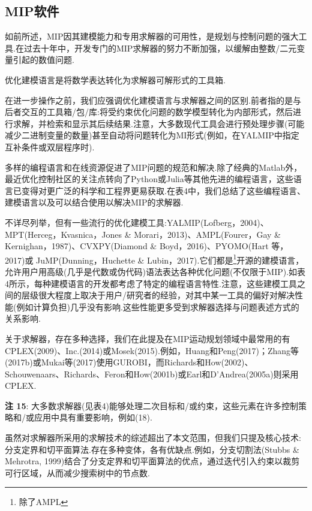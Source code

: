 \documentclass[10pt]{article}
\begin{document}
\subsection{MIP软件}

如前所述，MIP因其建模能力和专用求解器的可用性，是规划与控制问题的强大工具.在过去十年中，开发专门的MIP求解器的努力不断加强，以缓解由整数/二元变量引起的数值问题.

优化建模语言是将数学表达转化为求解器可解形式的工具箱.

在进一步操作之前，我们应强调优化建模语言与求解器之间的区别.前者指的是与后者交互的工具箱/包/库:将受约束优化问题的数学模型转化为内部形式，然后进行求解，并检索和显示其后续结果.注意，大多数现代工具会进行预处理步骤(可能减少二进制变量的数量)甚至自动将问题转化为MI形式(例如，在YALMIP中指定互补条件或双层程序时).



多样的编程语言和在线资源促进了MIP问题的规范和解决.除了经典的Matlab外，最近优化控制社区的关注点转向了Python或Julia等其他先进的编程语言，这些语言已变得对更广泛的科学和工程界更易获取.在表4中，我们总结了这些编程语言、建模语言以及可以结合使用以解决MIP的求解器.

不详尽列举，但有一些流行的优化建模工具:YALMIP(Lofberg，2004)、MPT(Herceg，Kvasnica，Jones \& Morari，2013)、AMPL(Fourer，Gay \& Kernighan，1987)、CVXPY(Diamond \& Boyd，2016)、PYOMO(Hart 等，2017)或 JuMP(Dunning，Huchette \& Lubin，2017).它们都是\footnote{除了AMPL}开源的建模语言，允许用户用高级(几乎是代数或伪代码)语法表达各种优化问题(不仅限于MIP).如表4所示，每种建模语言的开发都考虑了特定的编程语言特性.注意，这些建模工具之间的层级很大程度上取决于用户/研究者的经验，对其中某一工具的偏好对解决性能(例如计算负担)几乎没有影响.这些性能更多受到求解器选择与问题表述方式的关系影响.

关于求解器，存在多种选择，我们在此提及在MIP运动规划领域中最常用的有CPLEX(2009)、Inc.(2014)或Mosek(2015).例如，Huang和Peng(2017)；Zhang等(2017b)或Mukai等(2017)使用GUROBI，而Richards和How(2002)、Schouwenaars、Richards、Feron和How(2001b)或Earl和D'Andrea(2005a)则采用CPLEX.

\vspace{1 em}
\noindent\textbf{注 15}: 大多数求解器(见表4)能够处理二次目标和/或约束，这些元素在许多控制策略和/或应用中具有重要影响，例如(18).
\vspace{1 em}

虽然对求解器所采用的求解技术的综述超出了本文范围，但我们只提及核心技术:分支定界和切平面算法.存在多种变体，各有优缺点.例如，分支切割法(Stubbs \& Mehrotra, 1999)结合了分支定界和切平面算法的优点，通过迭代引入约束以裁剪可行区域，从而减少搜索树中的节点数.
\end{document}
